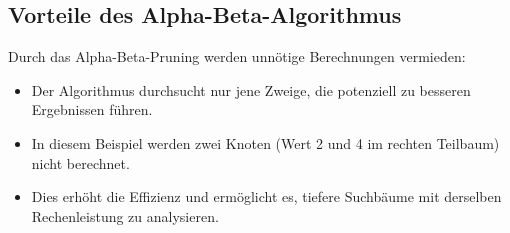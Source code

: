 \subsection*{Vorteile des Alpha-Beta-Algorithmus}

Durch das Alpha-Beta-Pruning werden unnötige Berechnungen vermieden:
\begin{itemize}
	\item Der Algorithmus durchsucht nur jene Zweige, die potenziell zu besseren Ergebnissen führen.
	\item In diesem Beispiel werden zwei Knoten (Wert 2 und 4 im rechten Teilbaum) nicht berechnet.
	\item Dies erhöht die Effizienz und ermöglicht es, tiefere Suchbäume mit derselben Rechenleistung zu analysieren.
\end{itemize}